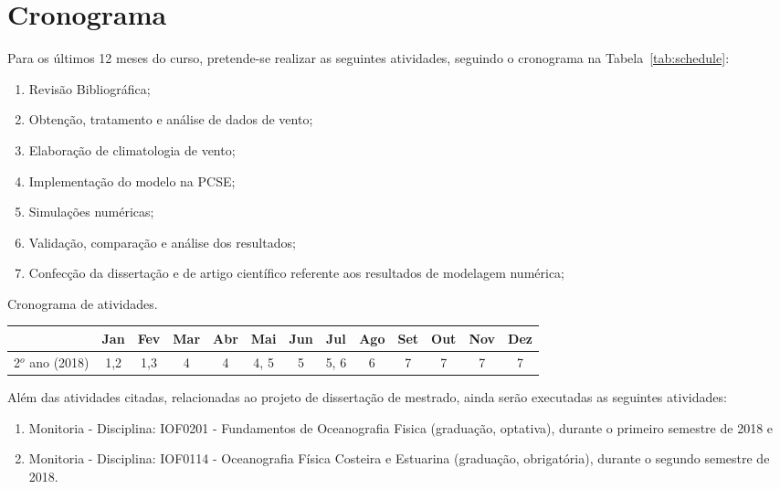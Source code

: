 \chapter{Cronograma}
\label{cha:schedule}

\hspace{5mm} Para os últimos 12 meses do curso, pretende-se realizar as seguintes atividades, seguindo o cronograma na Tabela~\ref{tab:schedule}:

\begin{enumerate}
    \item Revisão Bibliográfica;
    \item Obtenção, tratamento e análise de dados de vento;
    \item Elaboração de climatologia de vento;
    \item Implementação do modelo na PCSE;
    \item Simulações numéricas;
    \item Validação, comparação e análise dos resultados;
    \item Confecção da dissertação e de artigo científico referente aos resultados
    de modelagem numérica;
\end{enumerate}

\begin{tablehere}
\centering
\caption{Cronograma de atividades.}
\label{tab:schedule}
\begin{tabular}{|c|c|c|c|c|c|c|c|c|c|c|c|c|}
\hline
\textbf{}     & Jan & Fev & Mar & Abr & Mai    & Jun & Jul    & Ago   & Set & Out & Nov & Dez   \\ \hline
2$^o$ ano (2018) & 1,2 & 1,3 & 4  & 4  & 4, 5 & 5  & 5, 6 & 6    & 7  & 7  & 7  & 7    \\ \hline
\end{tabular}
\end{tablehere}
\bigskip

\hspace{5mm} Além das atividades citadas, relacionadas ao projeto de dissertação de mestrado, ainda serão executadas as seguintes atividades:

\begin{enumerate}
    \item Monitoria - Disciplina: IOF0201 - Fundamentos de Oceanografia Fisica (graduação, optativa), durante o primeiro semestre de 2018 e
    \item Monitoria - Disciplina: IOF0114 - Oceanografia Física Costeira e Estuarina (graduação, obrigatória), durante o segundo semestre de 2018.
\end{enumerate}